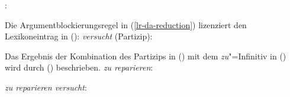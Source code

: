 {\eas
\label{le-versuchen-da}
:\\
\zs

\noindent
Die Argumentblockierungsregel in (\ref{lr-da-reduction}) lizenziert den Lexikoneintrag in ():
\eas
\label{le-versucht-hm}
\emph{versucht} (Partizip):\\
\zs

\noindent
Das Ergebnis der Kombination des Partizips in () mit dem \emph{zu}"=Infinitiv in
() wird durch () beschrieben.
\eas
\emph{zu reparieren}:\\
\zs

\eas
\label{ex-zu-reparieren-versucht}
\emph{zu reparieren versucht}:\\
\zs

}

